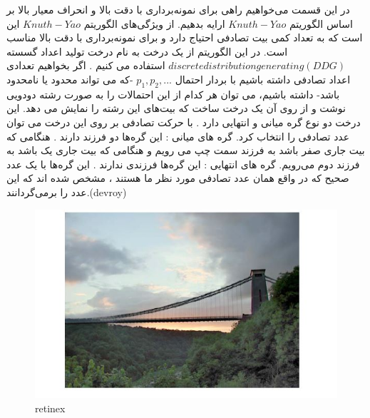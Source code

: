 در این قسمت می‌خواهیم راهی برای نمونه‌برداری با دقت بالا و انحراف معیار بالا بر اساس الگوریتم $Knuth-Yao$ ارایه بدهیم. از ویژگی‌های الگوریتم $Knuth-Yao$ این است که به تعداد کمی بیت تصادفی احتیاج دارد و برای نمونه‌برداری با دقت بالا مناسب است.  
در این الگوریتم از یک درخت به نام درخت تولید اعداد گسسته  $discrete distribution generating (DDG)$   استفاده می کنیم . 
اگر  بخواهیم تعدادی اعداد  تصادفی داشته باشیم با بردار احتمال $p_{1}, p_{2}, ...$ -که می تواند محدود یا نامحدود باشد- داشته باشیم، می توان هر کدام از این احتمالات را به صورت رشته دودویی نوشت و از روی آن یک درخت ساخت که بیت‌های این رشته را نمایش می دهد. این درخت دو نوع گره میانی و انتهایی دارد . با حرکت تصادفی بر روی این درخت می توان عدد تصادفی را انتخاب کرد. 
 گره های میانی : این گره‌ها دو فرزند دارند . هنگامی که بیت جاری صفر باشد به فرزند سمت چپ می رویم و هنگامی که بیت جاری یک باشد به فرزند دوم می‌رویم. 
 گره های انتهایی : این گره‌ها فرزندی ندارند . این گره‌ها با یک عدد صحیح  که در واقع همان عدد تصادفی مورد نظر ما هستند ، مشخص شده اند که این عدد را برمی‌گردانند.(devroy)

      \begin{figure}[!htb]
      	\includegraphics[width=\linewidth]{images/retinex1}
      	\caption{retinex}\label{fig:logtonemap}
      	\endminipage\hfill
      \end{figure}
      
